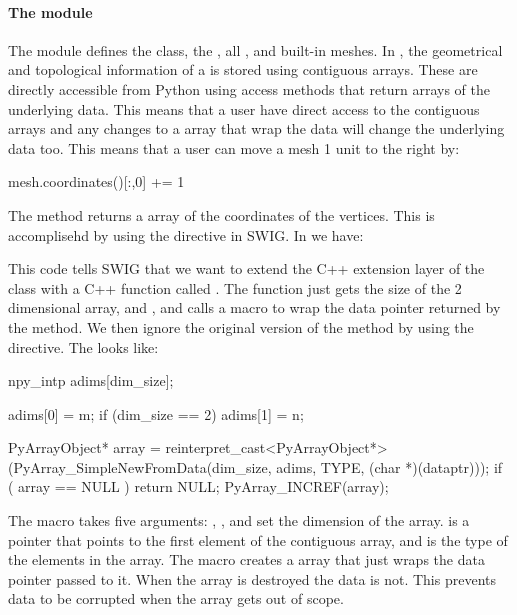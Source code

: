 \paragraph{The  module}
The  module defines the  class, the , all , and built-in meshes. In \dolfin,  the geometrical and topological information of a  is stored using contiguous arrays. These are directly accessible from Python using access methods that return \numpy arrays of the underlying data. This means that a user have direct access to the contiguous arrays and any changes to a \numpy array that wrap the data will change the underlying data too. This means that a user can move a mesh 1 unit to the right by:
\begin{python}
mesh.coordinates()[:,0] += 1
\end{python}
The  method returns a \numpy array of the coordinates of the vertices. This is accomplisehd by using the  directive in SWIG. In  we have:
This code tells SWIG that we want to extend the C++ extension layer of the  class with a C++ function called . The function just gets the size of the 2 dimensional array,  and , and calls a macro  to wrap the data pointer returned by the  method. We then ignore the original version of the  method by using the  directive. The  looks like:
\begin{c++}
  npy_intp adims[dim_size];

  adims[0] = m;
  if (dim_size == 2)
    adims[1] = n;

  PyArrayObject* array = reinterpret_cast<PyArrayObject*>(PyArray_SimpleNewFromData(dim_size, adims, TYPE, (char *)(dataptr)));
  if ( array == NULL ) return NULL;
  PyArray_INCREF(array);
\end{c++}
The macro takes five arguments: , , and  set the dimension of the \numpy array.  is a pointer that points to the first element of the contiguous array, and  is the type of the elements in the array. The \numpy macro  creates a \numpy array that just wraps the data pointer passed to it. When the \numpy array is destroyed the data is not. This prevents data to be corrupted when the \numpy array gets out of scope. \par

